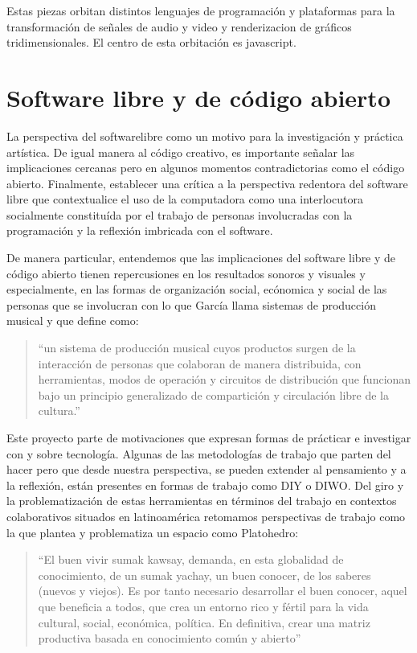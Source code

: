 Estas piezas orbitan distintos lenguajes de programación y plataformas para la transformación de señales de audio y video y \gls{renderizacion} de gráficos tridimensionales. El centro de esta orbitación es \Gls{javascript}. 

\section{Software libre y de código abierto}

La perspectiva del \gls{softwarelibre} como un motivo para la investigación y práctica artística. De igual manera al código creativo, es importante señalar las implicaciones cercanas pero en algunos momentos contradictorias como el código abierto. Finalmente, establecer una crítica a la perspectiva redentora del software libre que contextualice el uso de la computadora como una interlocutora socialmente constituída por el trabajo de personas involucradas con la programación y la reflexión imbricada con el software.

De manera particular, entendemos que las implicaciones del software libre y de código abierto tienen repercusiones en los resultados sonoros y visuales y especialmente, en las formas de organización social, ecónomica y social de las personas que se involucran con lo que García llama sistemas de producción musical y que define como:

\begin{quote}

  ``un sistema de producción musical cuyos productos surgen de la interacción de personas que colaboran de manera distribuida, con herramientas, modos de operación y circuitos de distribución que funcionan bajo un principio generalizado de compartición y circulación libre de la cultura.''\citep[p.~65]{jorgeDavid2021}

\end{quote}

Este proyecto parte de motivaciones que expresan formas de prácticar e investigar con y sobre tecnología. Algunas de las metodologías de trabajo que parten del hacer pero que desde nuestra perspectiva, se pueden extender al pensamiento y a la reflexión, están presentes en formas de trabajo como DIY o DIWO. Del giro y la problematización de estas herramientas en términos del trabajo en contextos colaborativos situados en latinoamérica retomamos perspectivas de trabajo como la que plantea y problematiza un espacio como Platohedro:

\begin{quote}

  ``El buen vivir sumak kawsay, demanda, en esta globalidad de conocimiento, de un sumak yachay, un buen conocer, de los saberes (nuevos y viejos). Es por tanto necesario desarrollar el buen conocer, aquel que beneficia a todos, que crea un entorno rico y fértil para la vida cultural, social, económica, política. En definitiva, crear una matriz productiva basada en conocimiento común y abierto''\citep[p.~31]{platohedro}

\end{quote}

